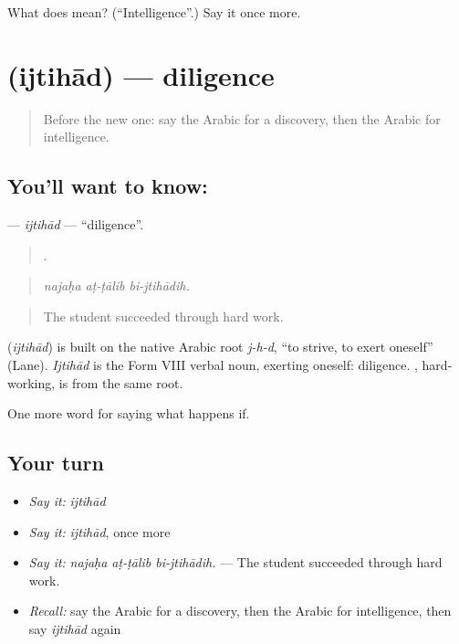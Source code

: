 \begin{tcolorbox}[breakable,colback=teal!4,colframe=teal!35!black,title={Before you move on}]
What does  mean? (\textquotedblleft{}Intelligence\textquotedblright{}.) Say it once more.
\end{tcolorbox}
\section[\texorpdfstring{\ar{اجتهاد} (ijtihād)}{اجتهاد (ijtihād)}]{ (ijtihād) — diligence}

\label{lesson:AR-C421-ijtihad}



\begin{quote}
Before the new one: say the Arabic for a discovery, then the Arabic for intelligence.
\end{quote}

\subsection*{You'll want to know: }
\textbf{} — \emph{ijtihād} — \textquotedblleft{}diligence\textquotedblright{}.

\begin{quote}
  .
\end{quote}

\begin{quote}
\emph{najaḥa aṭ-ṭālib bi-jtihādih.}
\end{quote}

\begin{quote}
The student succeeded through hard work.
\end{quote}

\begin{cousinweb}
\textbf{} (\emph{ijtihād}) is built on the native Arabic root \emph{j-h-d}, \textquotedblleft{}to strive, to exert oneself\textquotedblright{} (Lane). \emph{Ijtihād} is the Form VIII verbal noun, exerting oneself: diligence. , hard-working, is from the same root.
\end{cousinweb}

\begin{grammarlens}[title={What you've built}]
One more word for saying what happens if.
\end{grammarlens}

\subsection*{Your turn}
\begin{itemize}
\raggedright
  \item \emph{Say it:} \emph{ijtihād}
  \item \emph{Say it:} \emph{ijtihād}, once more
  \item \emph{Say it:} \emph{najaḥa aṭ-ṭālib bi-jtihādih.} — The student succeeded through hard work.
  \item \emph{Recall:} say the Arabic for a discovery, then the Arabic for intelligence, then say \emph{ijtihād} again
\end{itemize}

